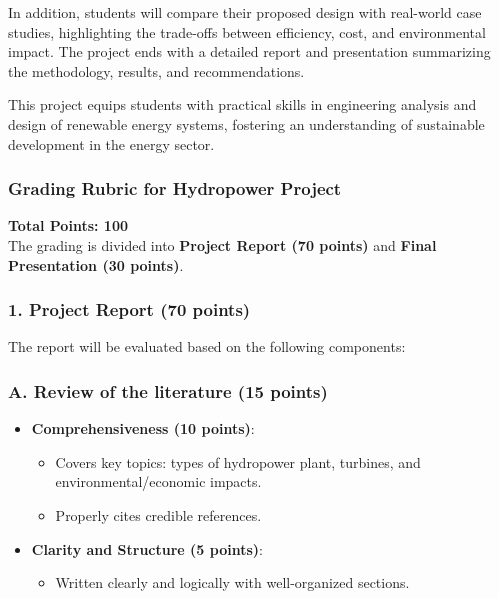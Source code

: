 \documentclass[11pt]{article}
\begin{document}
In addition, students will compare their proposed design with real-world case studies, highlighting the trade-offs between efficiency, cost, and environmental impact. The project ends with a detailed report and presentation summarizing the methodology, results, and recommendations.

This project equips students with practical skills in engineering analysis and design of renewable energy systems, fostering an understanding of sustainable development in the energy sector.


\subsubsection*{Grading Rubric for Hydropower Project}

\textbf{Total Points: 100}\\
The grading is divided into \textbf{Project Report (70 points)} and \textbf{Final Presentation (30 points)}.

\subsubsection*{1. Project Report (70 points)}
The report will be evaluated based on the following components:

\subsubsection*{A. Review of the literature (15 points)}
\begin{itemize}
    \item \textbf{Comprehensiveness (10 points)}:
    \begin{itemize}
        \item Covers key topics: types of hydropower plant, turbines, and environmental/economic impacts.
        \item Properly cites credible references.
    \end{itemize}
    \item \textbf{Clarity and Structure (5 points)}:
    \begin{itemize}
        \item Written clearly and logically with well-organized sections.
    \end{itemize}
\end{itemize}
\end{document}
